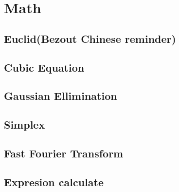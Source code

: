 \newpage
\section{Math}

\subsection{Euclid(Bezout Chinese reminder)} 
 

\subsection{Cubic Equation}


\subsection{Gaussian Ellimination}


\subsection{Simplex}


\subsection{Fast Fourier Transform}


\subsection{Expresion calculate}
%